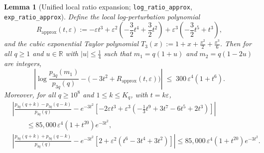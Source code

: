 \documentclass[11pt,a4paper]{article}
\numberwithin{equation}{section}
\theoremstyle{plain}
\newtheorem{lemma}[theorem]{Lemma}
\theoremstyle{definition}
\theoremstyle{remark}
\newcommand{\R}{\mathbb{R}}
\newcommand{\code}[1]{\texttt{\small #1}}
\begin{document}
\begin{lemma}[Unified local ratio expansion; \code{log\_ratio\_approx}, \code{exp\_ratio\_approx}]
\label{lem:local-exp}
Define the local log-perturbation polynomial
\begin{equation}\label{eq:Rapprox-def}
  R_{\mathrm{approx}}(t,\varepsilon)
  := -\varepsilon t^3
   + \varepsilon^2\!\left(-\frac{3}{2}t^4 + \frac{3}{2}t^2\right)
   + \varepsilon^3\!\left(-\frac{3}{2}t^5 + t^3\right),
\end{equation}
and the cubic exponential Taylor polynomial $T_3(x):=1+x+\frac{x^2}{2}+\frac{x^3}{6}$. Then for all $q\ge 1$ and $u\in\R$ with $|u|\le \frac{1}{4}$ such that $m_1=q(1+u)$ and $m_2=q(1-2u)$ are integers,
\begin{equation}\label{eq:log-ratio-approx}
  \left|\log\frac{p_{3q}(m_1)}{p_{3q}(q)} - \bigl(-3t^2 + R_{\mathrm{approx}}(t,\varepsilon)\bigr)\right|
  \;\le\; 300\,\varepsilon^4(1+t^6).
\end{equation}
Moreover, for all $q\ge 10^8$ and $1\le k\le K_q$, with $t=k\varepsilon$,
\begin{align}
  &\left|\frac{p_{3q}(q+k)-p_{3q}(q-k)}{p_{3q}(q)}
    - e^{-3t^2}\!\left[-2\varepsilon t^3 + \varepsilon^3\!\left(-\frac{1}{3}t^9+3t^7-6t^5+2t^3\right)\right]\right|\nonumber\\
  &\qquad\le 85{,}000\,\varepsilon^4(1+t^{20})e^{-3t^2}, \label{eq:local-diff}\\
  &\left|\frac{p_{3q}(q+k)+p_{3q}(q-k)}{p_{3q}(q)}
    - e^{-3t^2}\!\left[2 + \varepsilon^2\!\left(t^6-3t^4+3t^2\right)\right]\right|
  \le 85{,}000\,\varepsilon^4(1+t^{20})e^{-3t^2}. \label{eq:local-sum}
\end{align}
\end{lemma}
\end{document}
